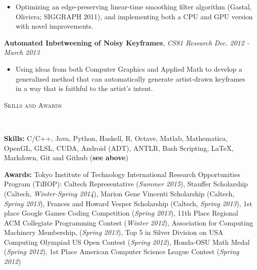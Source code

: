 \documentclass[9pt]{article}
\newenvironment{changemargin}[2]{%
  \begin{list}{}{%
    \setlength{\topsep}{0pt}%
    \setlength{\leftmargin}{#1}%
    \setlength{\rightmargin}{#2}%
    \setlength{\listparindent}{\parindent}%
    \setlength{\itemindent}{\parindent}%
    \setlength{\parsep}{\parskip}%
  }%
  \item[]}{\end{list}
}
\newcommand{\lineover}{
	\begin{changemargin}{-0.05in}{-0.05in}
		\vspace*{-8pt}
		\hrulefill \\
		\vspace*{-2pt}
	\end{changemargin}
}
\newcommand{\header}[1]{
	\begin{changemargin}{-0.5in}{-0.5in}
		\scshape{#1}\\
  	\lineover
	\end{changemargin}
}
\newenvironment{body} {
	\vspace*{-16pt}
	\begin{changemargin}{-0.25in}{-0.5in}
  }	
	{\end{changemargin}
}
\begin{document}
\begin{body}
	\begin{itemize} \itemsep -0pt
		\item Optimizing an edge-preserving linear-time smoothing filter algorithm (Gastal, Oliviera; SIGGRAPH 2011), and implementing both a CPU and GPU version with novel improvements.
	\end{itemize}
	\textbf{Automated Inbetweening of Noisy Keyframes}, \emph{CS81 Research} \hfill \emph{Dec. 2012 - March 2013} \\
		\vspace*{-3pt}
	\begin{itemize} \itemsep -0pt
		\item Using ideas from both Computer Graphics and Applied Math to develop a generalized method that can automatically generate artist-drawn keyframes in a way that is faithful to the artist's intent.
	\end{itemize}

\end{body}

\smallskip

\header{Skills and Awards}
\smallskip
\begin{body}
	\vspace{18pt}
	
	\textbf{Skills:} C/C++, Java, Python, Haskell, R, Octave, Matlab, Mathematica, OpenGL, GLSL, CUDA, Android (ADT), ANTLR, Bash Scripting, \LaTeX, Markdown, Git and Github (\textbf{see above})\\
	
	\medskip
	
	\textbf{Awards:} Tokyo Institute of Technology International Research Opportunities Program (TiROP): Caltech Representative (\emph{Summer 2015}), Stauffer Scholarship (Caltech, \emph{Winter-Spring 2014}), Marion Gene Vincenti Scholarship (Caltech, \emph{Spring 2013}),
        Frances and Howard Vesper Scholarship (Caltech, \emph{Spring 2013}),
        1st place Google Games Coding Competition (\emph{Spring 2013}),
        11th Place Regional ACM Collegiate Programming Contest (\emph{Winter 2012}),
        Association for Computing Machinery Membership, (\emph{Spring 2013}),
        Top 5 in Silver Division on USA Computing Olympiad US Open Contest (\emph{Spring 2012}),
        Honda-OSU Math Medal (\emph{Spring 2012}),
        1st Place American Computer Science League Contest (\emph{Spring 2012})
	
	
%
\end{body}
\end{document}
